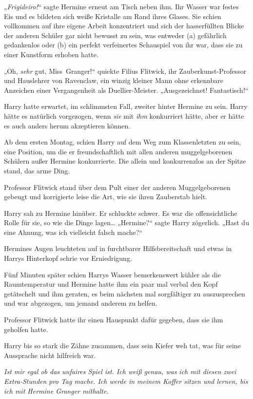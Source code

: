 {„\emph{Frigideiro!}“ sagte Hermine erneut am Tisch neben ihm. Ihr Wasser war festes Eis und es bildeten sich weiße Kristalle am Rand ihres Glases. Sie schien vollkommen auf ihre eigene Arbeit konzentriert und sich der hasserfüllten Blicke der anderen Schüler gar nicht bewusst zu sein, was entweder (a) gefährlich gedankenlos oder (b) ein perfekt verfeinertes Schauspiel von ihr war, dass sie zu einer Kunstform erhoben hatte.

„Oh, \emph{sehr} gut, Miss~Granger!“ quiekte Filius Flitwick, ihr Zauberkunst-Professor und Hauslehrer von Ravenclaw, ein winzig kleiner Mann ohne erkennbare Anzeichen einer Vergangenheit als Duellier-Meister. „Ausgezeichnet! Fantastisch!“

Harry hatte erwartet, im schlimmsten Fall, zweiter hinter Hermine zu sein. Harry hätte es natürlich vorgezogen, wenn \emph{sie} mit \emph{ihm} konkurriert hätte, aber er hätte es auch anders herum akzeptieren können.

Ab dem ersten Montag, schien Harry auf dem Weg zum Klassenletzten zu sein, eine Position, um die er freundschaftlich mit allen anderen muggelgeborenen Schülern außer Hermine konkurrierte. Die allein und konkurrenzlos an der Spitze stand, das arme Ding.

Professor Flitwick stand über dem Pult einer der anderen Muggelgeborenen gebeugt und korrigierte leise die Art, wie sie ihren Zauberstab hielt.

Harry sah zu Hermine hinüber. Er schluckte schwer. Es war die offensichtliche Rolle für sie, so wie die Dinge lagen… „Hermine?“ sagte Harry zögerlich. „Hast du eine Ahnung, was ich vielleicht falsch mache?“

Hermines Augen leuchteten auf in furchtbarer Hilfsbereitschaft und etwas in Harrys Hinterkopf schrie vor Erniedrigung.

Fünf Minuten später schien Harrys Wasser bemerkenswert kühler als die Raumtemperatur und Hermine hatte ihm ein paar mal verbal den Kopf getätschelt und ihm geraten, es beim nächsten mal sorgfältiger zu auszusprechen und war abgezogen, um jemand anderem zu helfen.

Professor Flitwick hatte ihr einen Hauspunkt dafür gegeben, dass sie ihm geholfen hatte.

Harry bis so stark die Zähne zusammen, dass sein Kiefer weh tat, was für seine Aussprache nicht hilfreich war.

\emph{Ist mir egal ob das unfaires Spiel ist. Ich weiß genau, was ich mit diesen zwei Extra-Stunden pro Tag mache. Ich werde in meinem Koffer sitzen und lernen, bis ich mit Hermine Granger mithalte.}

}
